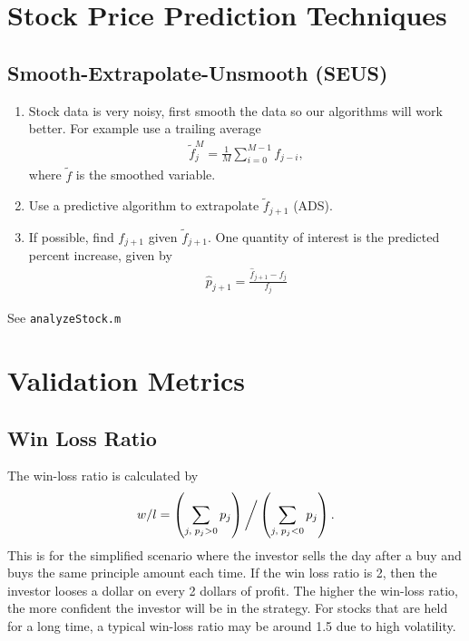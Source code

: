 \section{Stock Price Prediction Techniques}

\subsection{Smooth-Extrapolate-Unsmooth (SEUS)}

\begin{enumerate}
\item Stock data is very noisy, first smooth the data so our algorithms will work better.
For example use a trailing average
\begin{align}
\tilde{f}_{j}^M = \frac{1}{M} \sum_{i=0}^{M-1} f_{j-i},
\end{align}
where $\tilde{f}$ is the smoothed variable.
%
\item Use a predictive algorithm to extrapolate $\tilde{f}_{j+1}$ (ADS).
%
\item If possible, find $f_{j+1}$ given $\tilde{f}_{j+1}.$ One quantity of 
interest is the predicted percent increase, given by
\begin{align}
\hat{p}_{j+1} = \frac{\hat{f}_{j+1}-f_j}{f_j}
\end{align}
%
\end{enumerate}

See \lstinline{analyzeStock.m}

\section{Validation Metrics}

\subsection{Win Loss Ratio}
The win-loss ratio is calculated by
\begin{align}
w/l = \left(\sum_{j, \; p_j > 0} p_j\right)\bigg{/}\left(\sum_{j, \; p_j < 0} p_j\right).
\end{align}
%
This is for the simplified scenario where the investor sells the day after a buy and buys
the same principle amount each time. If the win loss ratio is 2, then 
the investor looses a dollar on every 2 dollars of profit. The higher the win-loss ratio,
the more confident the investor will be in the strategy. For stocks that are held for a long 
time, a typical win-loss ratio may be around 1.5 due to high volatility. 


